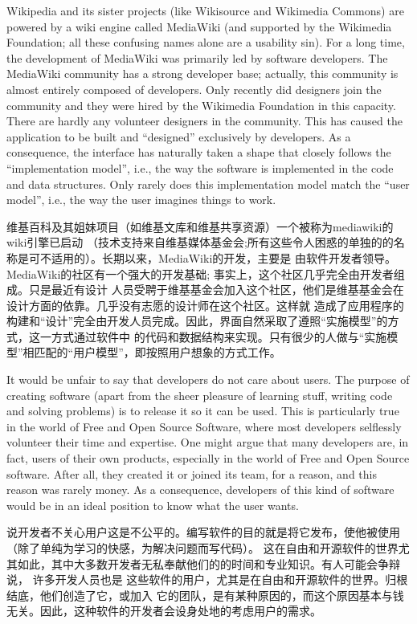 Wikipedia and its sister projects (like Wikisource and Wikimedia Commons)
are powered by a wiki engine called MediaWiki
(and supported by the Wikimedia Foundation; all these confusing names alone are
a usability sin). For a long time, the development of MediaWiki was primarily
led by software developers. The MediaWiki community has a strong developer base;
actually, this community is almost entirely composed of developers. Only
recently did designers join the community and they were hired by the Wikimedia
Foundation in this capacity. There are hardly any volunteer designers in the
community. This has caused the application to be built and ``designed''
exclusively by developers. As a consequence, the interface has naturally taken a
shape that closely follows the ``implementation model'', i.e., the way the
software is implemented in the code and data structures. Only rarely does this
implementation model match the ``user model'', i.e., the way the user imagines
things to work.

维基百科及其姐妹项目（如维基文库和维基共享资源）一个被称为mediawiki的wiki引擎已启动 
（技术支持来自维基媒体基金会;所有这些令人困惑的单独的的名称是可不适用的）。长期以来，MediaWiki的开发，主要是 
由软件开发者领导。 MediaWiki的社区有一个强大的开发基础; 事实上，这个社区几乎完全由开发者组成。只是最近有设计
人员受聘于维基基金会加入这个社区，他们是维基基金会在设计方面的依靠。几乎没有志愿的设计师在这个社区。这样就
造成了应用程序的构建和“设计”完全由开发人员完成。因此，界面自然采取了遵照“实施模型”的方式，这一方式通过软件中
的代码和数据结构来实现。只有很少的人做与“实施模型”相匹配的“用户模型”，即按照用户想象的方式工作。

It would be unfair to say that developers do not care about users. The purpose
of creating software (apart from the sheer pleasure of learning stuff,
writing code and solving problems) is to release it so it can be used. This is
particularly true in the world of Free and Open Source Software, where most
developers selflessly volunteer their time and expertise. One might argue that
many developers are, in fact, users of their own products, especially in the
world of Free and Open Source software. After all, they created it or joined
its team, for a reason, and this reason was rarely money. As a consequence,
developers of this kind of software would be in an ideal position to know what
the user wants.

说开发者不关心用户这是不公平的。编写软件的目的就是将它发布，使他被使用（除了单纯为学习的快感，为解决问题而写代码）。
这在自由和开源软件的世界尤其如此，其中大多数开发者无私奉献他们的的时间和专业知识。有人可能会争辩说， 许多开发人员也是
这些软件的用户，尤其是在自由和开源软件的世界。归根结底，他们创造了它，或加入 
它的团队，是有某种原因的，而这个原因基本与钱无关。因此，这种软件的开发者会设身处地的考虑用户的需求。

